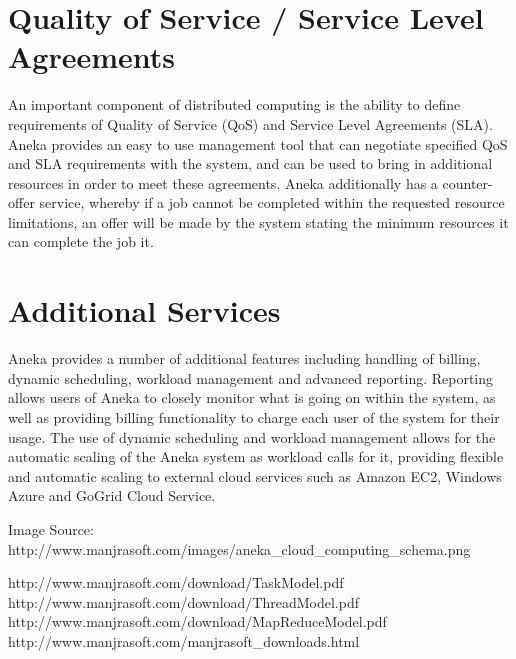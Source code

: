 \section{Quality of Service / Service Level Agreements}
An important component of distributed computing is the ability to define requirements of Quality of Service (QoS) and Service Level Agreements (SLA)\cite{CloudBus}. Aneka provides an easy to use management tool that can negotiate specified QoS and SLA requirements with the system, and can be used to bring in additional resources in order to meet these agreements. Aneka additionally has a counter-offer service, whereby if a job cannot be completed within the requested resource limitations, an offer will be made by the system stating the minimum resources it can complete the job it.

\section{Additional Services}
Aneka provides a number of additional features including handling of billing, dynamic scheduling, workload management and advanced reporting. Reporting allows users of Aneka to closely monitor what is going on within the system, as well as providing billing functionality to charge each user of the system for their usage. The use of dynamic scheduling and workload management allows for the automatic scaling of the Aneka system as workload calls for it, providing flexible and automatic scaling to external cloud services such as Amazon EC2, Windows Azure and GoGrid Cloud Service.  

Image Source: http://www.manjrasoft.com/images/aneka\_cloud\_computing\_schema.png

\ftAnthree http://www.manjrasoft.com/download/TaskModel.pdf
\ftAnfour http://www.manjrasoft.com/download/ThreadModel.pdf
\ftAnfive http://www.manjrasoft.com/download/MapReduceModel.pdf
\ftAnone http://www.manjrasoft.com/manjrasoft\_downloads.html
